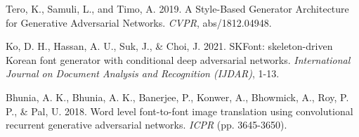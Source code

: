 \documentclass[letterpaper]{article}
\begin{document}
\smallskip \noindent
Tero, K., Samuli, L., and Timo, A. 2019. A Style-Based Generator Architecture for Generative Adversarial Networks. \textit{CVPR}, abs/1812.04948.

\smallskip \noindent
Ko, D. H., Hassan, A. U., Suk, J., \& Choi, J. 2021. SKFont: skeleton-driven Korean font generator with conditional deep adversarial networks. \textit{International Journal on Document Analysis and Recognition (IJDAR)}, 1-13.

\smallskip \noindent
Bhunia, A. K., Bhunia, A. K., Banerjee, P., Konwer, A., Bhowmick, A., Roy, P. P., \& Pal, U. 2018. Word level font-to-font image translation using convolutional recurrent generative adversarial networks. \textit{ICPR} (pp. 3645-3650).





\end{document}
